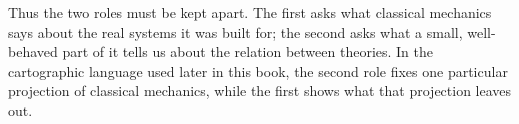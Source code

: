 Thus the two roles must be kept apart. The first asks what classical
mechanics says about the real systems it was built for; the second asks
what a small, well-behaved part of it tells us about the relation between
theories. In the cartographic language used later in this book, the
second role fixes one particular projection of classical mechanics, while
the first shows what that projection leaves out.

